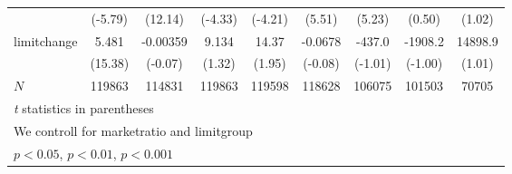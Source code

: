 {\begin{tabular}{l*{8}{c}}
            &     (-5.79)         &     (12.14)         &     (-4.33)         &     (-4.21)         &      (5.51)         &      (5.23)         &      (0.50)         &      (1.02)         \\
[1em]
limitchange &       5.481\sym{***}&    -0.00359         &       9.134         &       14.37         &     -0.0678         &      -437.0         &     -1908.2         &     14898.9         \\
            &     (15.38)         &     (-0.07)         &      (1.32)         &      (1.95)         &     (-0.08)         &     (-1.01)         &     (-1.00)         &      (1.01)         \\
\hline
\(N\)       &      119863         &      114831         &      119863         &      119598         &      118628         &      106075         &      101503         &       70705         \\
\hline\hline
\multicolumn{9}{l}{\footnotesize \textit{t} statistics in parentheses}\\
\multicolumn{9}{l}{\footnotesize We controll for marketratio and limitgroup}\\
\multicolumn{9}{l}{\footnotesize \sym{*} \(p<0.05\), \sym{**} \(p<0.01\), \sym{***} \(p<0.001\)}\\
\end{tabular}
}
